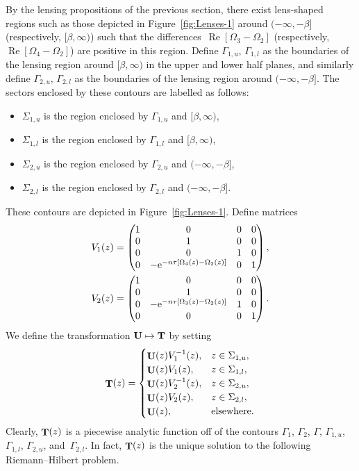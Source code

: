 \documentclass[10pt,a4paper]{amsart}
\DeclareMathOperator{\TT}{{\bf T}}
\DeclareMathOperator{\UU}{{\bf U}}
\numberwithin{equation}{section}
\begin{document}
By the lensing propositions of the previous section, there exist lens-shaped regions such as those depicted in Figure~\ref{fig:Lenses-1} around $(-\infty,-\beta]$ (respectively, $[\beta,\infty)$) such that the differences~${\operatorname{Re}[\Omega_3-\Omega_2]}$ (respectively, $\operatorname{Re}[\Omega_4-\Omega_2]$) are positive in this region. Define $\Gamma_{1,u}$, $\Gamma_{1,l}$ as the boundaries of the lensing region around $[\beta,\infty)$ in the upper and lower half planes, and similarly define $\Gamma_{2,u}$, $\Gamma_{2,l}$ as the boundaries of the lensing region around $(-\infty,-\beta]$.
The sectors enclosed by these contours are labelled as follows:
 \begin{itemize}\itemsep=0pt
 \item $\Sigma_{1,u}$ is the region enclosed by $\Gamma_{1,u}$ and $[\beta,\infty)$,
 \item $\Sigma_{1,l}$ is the region enclosed by $\Gamma_{1,l}$ and $[\beta,\infty)$,
 \item $\Sigma_{2,u}$ is the region enclosed by $\Gamma_{2,u}$ and $(-\infty,-\beta]$,
 \item $\Sigma_{2,l}$ is the region enclosed by $\Gamma_{2,l}$ and $(-\infty,-\beta]$.
 \end{itemize}
These contours are depicted in Figure~\ref{fig:Lenses-1}. Define matrices
 \begin{gather*}
 V_1(z) =
 \begin{pmatrix}
 1 & 0 & 0 & 0\\
 0 & 1 & 0 & 0\\
 0 & 0 & 1 & 0\\
 0 & -{\rm e}^{-n\tau[\Omega_4(z) - \Omega_2(z)]} & 0 & 1
 \end{pmatrix}, \\
 V_2(z) =
 \begin{pmatrix}
 1 & 0 & 0 & 0\\
 0 & 1 & 0 & 0\\
 0 & -{\rm e}^{-n\tau[\Omega_3(z) - \Omega_2(z)]} & 1 & 0\\
 0 & 0 & 0 & 1
 \end{pmatrix}.
 \end{gather*}
We define the transformation ${\bf U} \mapsto {\bf T}$ by setting
 \begin{equation*}
 \TT(z) =
 \begin{cases}
 \UU(z) V_1^{-1}(z), & z \in \Sigma_{1,u},\\
 \UU(z) V_1(z), & z \in \Sigma_{1,l},\\
 \UU(z) V_2^{-1}(z), & z \in \Sigma_{2,u},\\
 \UU(z) V_2(z), & z \in \Sigma_{2,l},\\
 \UU(z), & \text{elsewhere}.
 \end{cases}
 \end{equation*}
Clearly, $\TT(z)$ is a piecewise analytic function off of the contours $\Gamma_1$, $\Gamma_2$, $\Gamma$, $\Gamma_{1,u}$, $\Gamma_{1,l}$, $\Gamma_{2,u}$,
and~$\Gamma_{2,l}$. In fact, $\TT(z)$ is the unique solution to the following Riemann--Hilbert problem.
\end{document}
